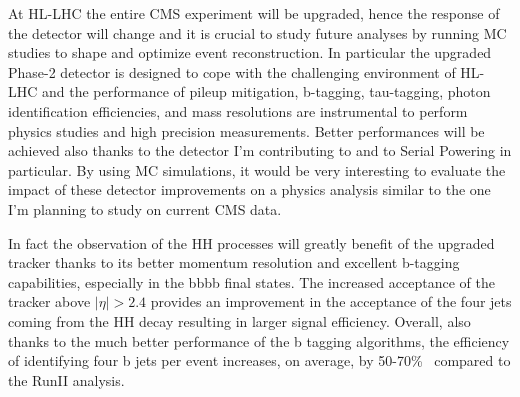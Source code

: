 \documentclass[a4paper,11pt,english]{article}
\begin{document}
\begin{description}[style=unboxed,leftmargin=.2cm]
\item[Simulation based Phase-2 physics studies: HH$\to$bbbb.] At HL-LHC %
the entire CMS experiment will be upgraded, hence the response of the detector will change and it is crucial to study future analyses by running MC studies to shape and optimize event reconstruction. In particular the upgraded Phase-2 detector is designed to cope with the challenging environment of \mbox{HL-LHC} and the performance of pileup mitigation, b-tagging, tau-tagging, photon identification efficiencies, and mass resolutions are instrumental to perform physics studies and high precision measurements. 
Better performances will be achieved also thanks to the detector I'm contributing to and to Serial Powering in particular. By using MC simulations, it would be very interesting to evaluate the impact of these detector improvements on a physics analysis similar to the one I'm planning to study on current CMS data. %

In fact the observation of the HH processes will greatly benefit of the upgraded tracker thanks to its better momentum resolution and excellent b-tagging capabilities, especially in the bbbb final states. The increased acceptance of the tracker above $|\eta|>2.4$ provides an improvement in the acceptance of the four jets coming from the HH decay resulting in larger signal efficiency. Overall, also thanks to the much better performance of the b tagging algorithms, the efficiency of identifying four b jets per event increases, on average, by 50-70\%~\cite{TDR} compared to the RunII analysis.
\begin{siderules}
\end{siderules}
\end{description}
\end{document}
